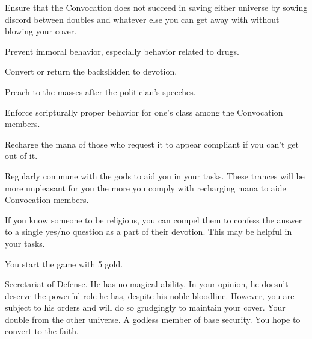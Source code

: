 \documentclass[char]{guildcamp3}
\begin{document}
\begin{itemz}[Goals]
  \item Ensure that the Convocation does not succeed in saving either universe by sowing discord between doubles and whatever else you can get away with without blowing your cover.
  \item Prevent immoral behavior, especially behavior related to drugs.
  \item Convert or return the backslidden to devotion.
  \item Preach to the masses after the politician's speeches.
  \item Enforce scripturally proper behavior for one's class among the Convocation members.
  \item Recharge the mana of those who request it to appear compliant if you can't get out of it.
  \item Regularly commune with the gods to aid you in your tasks. These trances will be more unpleasant for you the more you comply with recharging mana to aide Convocation members.
\end{itemz}

\begin{itemz}[Notes]
  \item If you know someone to be religious, you can compel them to confess the answer to a single yes/no question as a part of their devotion. This may be helpful in your tasks.
  \item You start the game with 5 gold. 
\end{itemz}


\begin{contacts}
  \contact{\cNobleOne{}} Secretariat of Defense. He has no magical ability. In your opinion, he doesn't deserve the powerful role he has, despite his noble bloodline. However, you are subject to his orders and will do so grudgingly to maintain your cover.
   Your double from the other universe. A godless member of base security. You hope to convert  to the faith.
\end{contacts}
\end{document}
